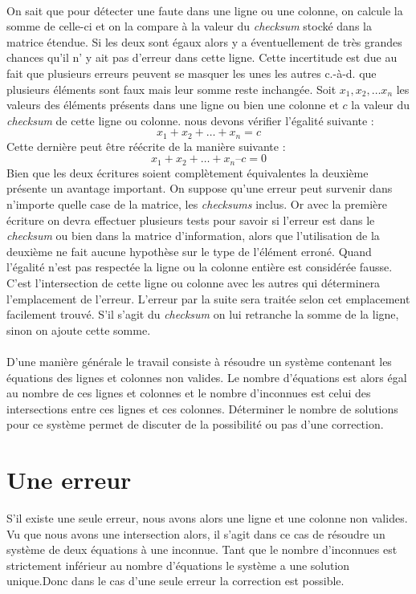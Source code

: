 \documentclass[a4paper, 10pt]{report}
\begin{document}
\paragraph*{}
On sait que pour détecter une faute dans une ligne ou une colonne,  on calcule la somme de celle-ci et on la compare à la 
valeur du \textit{checksum} stocké dans la matrice étendue. Si les deux sont égaux alors y a éventuellement de très grandes 
chances qu’il n’ y ait pas d’erreur dans cette ligne. Cette incertitude est due au fait que plusieurs erreurs peuvent se masquer 
les unes les autres c.-à-d. que plusieurs éléments sont faux mais leur somme reste inchangée. Soit $x_1, x_2,\ldots x_n$ 
les valeurs des éléments présents dans une ligne ou bien une colonne et $c$ la valeur du \textit{checksum} de cette ligne 
ou colonne. nous devons vérifier l’égalité suivante : \[x_1 + x_2 + \ldots + x_n = c\]
Cette dernière peut être réécrite de la manière suivante : \[x_1 + x_2 + \ldots + x_n – c = 0\]
Bien que les deux écritures soient complètement équivalentes la deuxième présente un avantage important. On suppose 
qu’une erreur peut survenir dans n’importe quelle case de la matrice, les \textit{checksums} inclus. Or avec la 
première écriture on devra effectuer plusieurs tests pour savoir si l’erreur est dans le \textit{checksum} ou bien dans 
la matrice d’information, alors que l’utilisation de la deuxième ne fait aucune hypothèse sur le type de l’élément erroné. 
Quand l’égalité n’est pas respectée la ligne ou la colonne entière est considérée fausse. C’est l’intersection de cette 
ligne ou colonne avec les autres qui déterminera l’emplacement de l’erreur. L’erreur par la suite sera traitée selon cet 
emplacement facilement trouvé. S’il s’agit du \textit{checksum} on lui retranche la somme de la ligne, sinon on ajoute cette somme.
\paragraph*{}
D’une manière générale le travail consiste à résoudre un système contenant les équations des lignes et colonnes non valides. 
Le nombre d’équations est alors égal au nombre de ces lignes et colonnes et le nombre d’inconnues est celui des intersections 
entre ces lignes et ces colonnes.\newline
Déterminer le nombre de solutions pour ce système permet de discuter de la possibilité ou pas d’une correction.

\section{Une erreur}
S’il existe une seule erreur, nous avons alors une ligne et une colonne non valides. Vu que nous avons une intersection 
alors, il s’agit dans ce cas de résoudre un système de deux équations à une inconnue.\newline
Tant que le nombre d’inconnues est strictement inférieur au nombre d’équations le système a une solution unique.Donc 
dans le cas d’une seule erreur la correction est possible.
\end{document}
